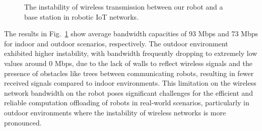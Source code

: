 \begin{figure}[htp]
    \centering
    \caption{The instability of wireless transmission between our robot and a base station in robotic IoT networks.}
    \label{fig:bandwidth} 
\end{figure}

The results in Fig.~\ref{fig:bandwidth} show average bandwidth capacities of 93 Mbps and 73 Mbps for indoor and outdoor scenarios, respectively. 
The outdoor environment exhibited higher instability, with bandwidth frequently dropping to extremely low values around 0 Mbps, due to the lack of walls to reflect wireless signals and the presence of obstacles like trees between communicating robots, resulting in fewer received signals compared to indoor environments. This limitation on the wireless network bandwidth on the robot poses significant challenges for the efficient and reliable computation offloading of robots in real-world scenarios, particularly in outdoor environments where the instability of wireless networks is more pronounced.

